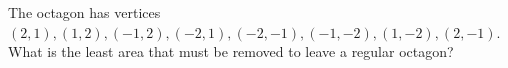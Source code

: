 The octagon has vertices $(2,1),(1,2),(-1,2),(-2,1),(-2,-1),(-1,-2),(1,-2),(2,-1)$. What is the least area that must be removed to leave a regular octagon?
